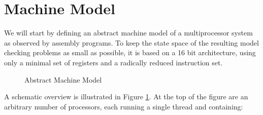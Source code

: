  \noindent

\section{Machine Model}








We will start by defining an abstract machine model of a multiprocessor system as observed by assembly programs.
To keep the state space of the resulting model checking problems as small as possible, it is based on a 16 bit architecture, using only a minimal set of registers and a radically reduced instruction set.

\begin{figure}[!h]
  \centering
  
  \caption{Abstract Machine Model}
  \label{fig:machine:overview}
\end{figure}

A schematic overview is illustrated in Figure \ref{fig:machine:overview}.
At the top of the figure are an arbitrary number of processors, each running a single thread and containing:

